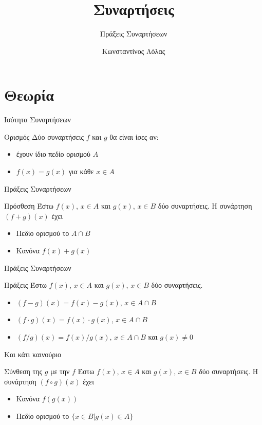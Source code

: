 \documentclass{presentation}
\title{Συναρτήσεις}
\subtitle{Πράξεις Συναρτήσεων}
\author[Λόλας]{Κωνσταντίνος Λόλας }
\institute[$10^ο$ ΓΕΛ]{$10^ο$ ΓΕΛ Θεσσαλονίκης}
\begin{document}
\begin{frame}
  \titlepage
\end{frame}

\section{Θεωρία}

\begin{frame}{Ισότητα Συναρτήσεων}
  \begin{block}{Ορισμός}
    Δύο συναρτήσεις $f$ και $g$ θα είναι ίσες αν:
    \begin{itemize}
      \item έχουν ίδιο πεδίο ορισμού $Α$
      \item $f(x)=g(x)$ για κάθε $x\in Α$
    \end{itemize}
  \end{block}
\end{frame}

\begin{frame}{Πράξεις Συναρτήσεων}
  \begin{block}{Πρόσθεση}
    Έστω $f(x)$, $x\in Α$ και $g(x)$, $x\in Β$ δύο συναρτήσεις. Η συνάρτηση $(f+g)(x)$ έχει
    \begin{itemize}
      \item Πεδίο ορισμού το $Α\cap Β$
      \item Κανόνα $f(x)+g(x)$
    \end{itemize}
  \end{block}
\end{frame}

\begin{frame}{Πράξεις Συναρτήσεων}
  \begin{block}{Πράξεις}
    Έστω $f(x)$, $x\in Α$ και $g(x)$, $x\in Β$ δύο συναρτήσεις.
    \begin{itemize}[<+->]
      \item $(f-g)(x)=f(x)-g(x)$, $x\in Α\cap Β$
      \item $(f\cdot g)(x)=f(x)\cdot g(x)$, $x\in Α\cap Β$
      \item $(f/g)(x)=f(x)/g(x)$, $x\in Α\cap Β$ και $g(x)\ne 0$
    \end{itemize}
  \end{block}
\end{frame}

\begin{frame}{Και κάτι καινούριο}
  \begin{block}{Σύνθεση της $g$ με την $f$}
    Έστω $f(x)$, $x\in Α$ και $g(x)$, $x\in Β$ δύο συναρτήσεις. Η συνάρτηση $(f\circ g)(x)$ έχει
    \begin{itemize}
      \item Κανόνα $f(g(x))$
      \item Πεδίο ορισμού το $\{x\in Β | g(x)\in Α \}$
    \end{itemize}
  \end{block}
  \centering
\end{frame}
\end{document}
